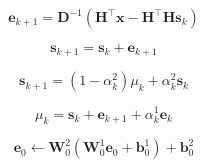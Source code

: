 \begin{equation}
    \mathbf{e}_{k+1}=\mathbf{D}^{-1}\left(\mathbf{H}^\top \mathbf{x}-\mathbf{H}^\top \mathbf{H} \mathbf{s}_k\right)
\end{equation}

\begin{equation}
\mathbf{s}_{k+1}=\mathbf{s}_k+\mathbf{e}_{k+1}
\end{equation}

\begin{equation}
\mathbf{s}_{k+1}=\left(1-\alpha_k^2\right) \mu_k + \alpha_k^2 \mathbf{s}_k
\end{equation}

\begin{equation}
\mu_k=\mathbf{s}_k+\mathbf{e}_{k+1}+\alpha_k^1 \mathbf{e}_k
\end{equation}

\begin{equation}
\mathbf{e}_0 \leftarrow \mathbf{W}_0^2\left(\mathbf{W}_0^1 \mathbf{e}_0+\mathbf{b}_0^1\right)+\mathbf{b}_0^2
\end{equation}

